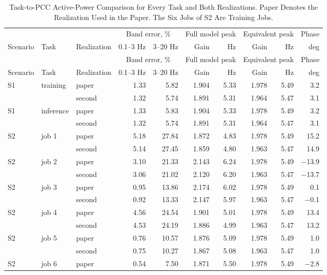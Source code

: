 {\small\setlength{\tabcolsep}{4.5pt}\setlength{\LTcapwidth}{\textwidth}
\begin{longtable}{lllrrrrrrr}
\caption{Task-to-PCC Active-Power Comparison for Every Task and Both Realizations.
Paper Denotes the Realization Used in the Paper.
The Six Jobs of S2 Are Training Jobs.}\label{tab:task-band}\\
\toprule
 & & & \multicolumn{2}{c}{Band error, \%} & \multicolumn{2}{c}{Full model peak} & \multicolumn{2}{c}{Equivalent peak} & Phase\\
Scenario & Task & Realization & 0.1--3 Hz & 3--20 Hz & Gain & Hz & Gain & Hz & deg\\\midrule
\endfirsthead
\toprule
 & & & \multicolumn{2}{c}{Band error, \%} & \multicolumn{2}{c}{Full model peak} & \multicolumn{2}{c}{Equivalent peak} & Phase\\
Scenario & Task & Realization & 0.1--3 Hz & 3--20 Hz & Gain & Hz & Gain & Hz & deg\\\midrule
\endhead
S1 & training & paper & 1.33 & 5.82 & 1.904 & 5.33 & 1.978 & 5.49 & 3.2 \\*
 &  & second & 1.32 & 5.74 & 1.891 & 5.31 & 1.964 & 5.47 & 3.1 \\
S1 & inference & paper & 1.33 & 5.83 & 1.904 & 5.33 & 1.978 & 5.49 & 3.2 \\*
 &  & second & 1.32 & 5.74 & 1.891 & 5.31 & 1.964 & 5.47 & 3.1 \\
\midrule
S2 & job 1 & paper & 5.18 & 27.84 & 1.872 & 4.83 & 1.978 & 5.49 & 15.2 \\*
 &  & second & 5.14 & 27.45 & 1.859 & 4.80 & 1.963 & 5.47 & 14.9 \\
S2 & job 2 & paper & 3.10 & 21.33 & 2.143 & 6.24 & 1.978 & 5.49 & $-$13.9 \\*
 &  & second & 3.06 & 21.02 & 2.120 & 6.20 & 1.963 & 5.47 & $-$13.7 \\
S2 & job 3 & paper & 0.95 & 13.86 & 2.174 & 6.02 & 1.978 & 5.49 & 0.1 \\*
 &  & second & 0.92 & 13.33 & 2.147 & 5.97 & 1.963 & 5.47 & $-$0.1 \\
S2 & job 4 & paper & 4.56 & 24.54 & 1.901 & 5.01 & 1.978 & 5.49 & 13.4 \\*
 &  & second & 4.53 & 24.19 & 1.886 & 4.99 & 1.963 & 5.47 & 13.2 \\
S2 & job 5 & paper & 0.76 & 10.57 & 1.876 & 5.09 & 1.978 & 5.49 & 1.0 \\*
 &  & second & 0.75 & 10.27 & 1.867 & 5.08 & 1.963 & 5.47 & 1.0 \\
S2 & job 6 & paper & 0.54 & 7.50 & 1.871 & 5.50 & 1.978 & 5.49 & $-$2.8 \\*

\end{longtable}}
